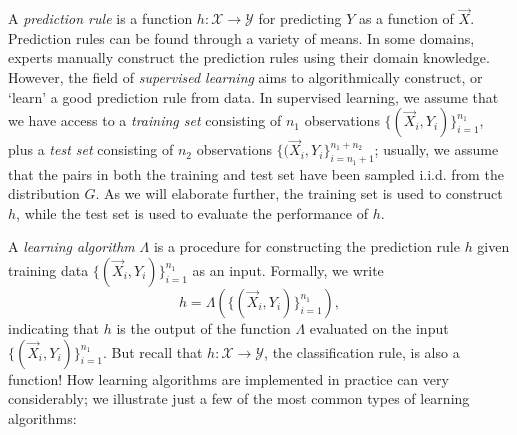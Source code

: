 A \emph{prediction rule} is a function $h: \mathcal{X} \to
\mathcal{Y}$ for predicting $Y$ as a function of $\vec{X}$.
Prediction rules can be found through a variety of means.  In some
domains, experts manually construct the prediction rules using their
domain knowledge.  However, the field of \emph{supervised learning}
aims to algorithmically construct, or `learn' a good prediction rule
from data.  In supervised learning, we assume that we have access to a
\emph{training set} consisting of $n_1$ observations
$\{(\vec{X}_i,Y_i)\}_{i=1}^{n_1}$, plus a \emph{test set} consisting
of $n_2$ observations $\{(\vec{X}_i,Y_i\}_{i=n_1 + 1}^{n_1 + n_2}$;
usually, we assume that the pairs in both the training and test set
have been sampled i.i.d. from the distribution $G$.  As we will
elaborate further, the training set is used to construct $h$, while
the test set is used to evaluate the performance of $h$.

A \emph{learning algorithm} $\Lambda$ is a procedure for constructing the
prediction rule $h$ given training data $\{(\vec{X}_i,Y_i)\}_{i=1}^{n_1}$ as
an input.  Formally, we write
\[
h = \Lambda(\{(\vec{X}_i,Y_i)\}_{i=1}^{n_1}),
\]
indicating that $h$ is the output of the function $\Lambda$ evaluated
on the input $\{(\vec{X}_i,Y_i)\}_{i=1}^{n_1}$.  But recall that $h:
\mathcal{X} \to \mathcal{Y}$, the classification rule, is also a
function!  How learning algorithms are implemented in practice can
very considerably; we illustrate just a few of the most common types
of learning algorithms:

